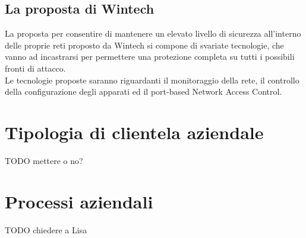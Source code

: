 \documentclass[Tesi.tex]{subfiles}
\begin{document}
\subsection{La proposta di Wintech}
La proposta per consentire di mantenere un elevato livello di sicurezza all'interno delle proprie reti proposto da Wintech si compone di svariate tecnologie, che vanno ad 
incastrarsi
per permettere una protezione completa su tutti i possibili fronti di attacco. \\
Le tecnologie proposte saranno riguardanti il monitoraggio della rete, il controllo della configurazione degli apparati ed il port-based Network Access Control.



\section{Tipologia di clientela aziendale}
TODO mettere o no?

\section{Processi aziendali}
TODO chiedere a Lisa
\end{document}
